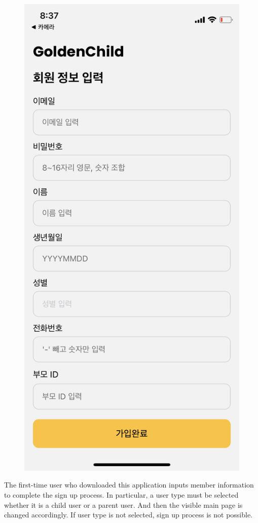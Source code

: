 \documentclass[conference]{IEEEtran}
\begin{document}
\begin{figure}[H]
\includegraphics[scale=0.1]{UseCases/3.signup2.png}
\end{figure}
The first-time user who downloaded this application inputs member information to complete the sign up process. In particular, a user type must be selected whether it is a child user or a parent user. And then the visible main page is changed accordingly. If user type is not selected, sign up process is not possible.\newline
\end{document}
